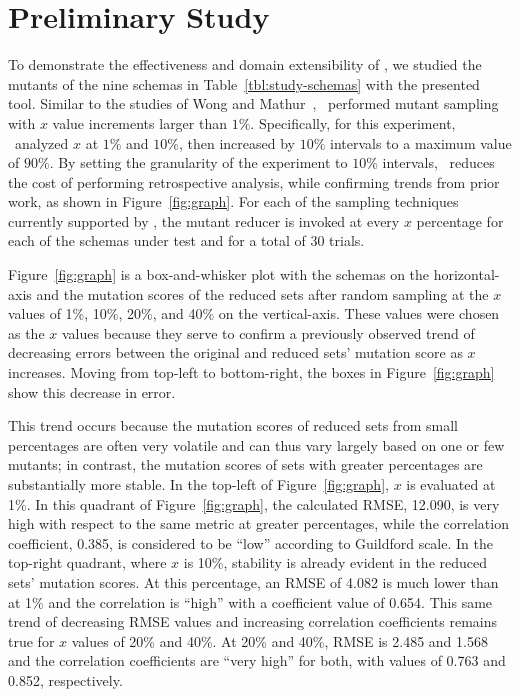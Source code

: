 \vspace*{-.25em}

\section{Preliminary Study}


To demonstrate the effectiveness and domain extensibility of \mrstudyr, we studied the mutants of the nine schemas in
Table~\ref{tbl:study-schemas} with the presented tool. Similar to the studies of Wong and
Mathur~\cite{mathur1994empirical}, \mr~performed mutant sampling with $x$ value increments larger than $1\%$.
Specifically, for this experiment, \mr~analyzed $x$ at $1\%$ and $10\%$, then increased by $10\%$ intervals to a maximum
value of $90\%$. By setting the granularity of the experiment to $10\%$ intervals, \mr~reduces the cost of performing
retrospective analysis, while confirming trends from prior work, as shown in Figure~\ref{fig:graph}. For each of the
sampling techniques currently supported by \mr, the mutant reducer is invoked at every $x$ percentage for each of the
schemas under test and for a total of 30 trials.


Figure~\ref{fig:graph} is a box-and-whisker plot with the schemas on the horizontal-axis and the mutation scores of the reduced
sets after random sampling at the $x$ values of 1\%, 10\%, 20\%, and 40\% on the vertical-axis.  These values were chosen as the
$x$ values because they serve to confirm a previously observed trend of decreasing errors between the original and reduced sets'
mutation score as $x$ increases. Moving from top-left to bottom-right, the boxes in Figure~\ref{fig:graph} show this decrease in
error.



This trend occurs because the mutation scores of reduced sets from small percentages are often very volatile and can
thus vary largely based on one or few mutants; in contrast, the mutation scores of sets with greater percentages are
substantially more stable. In the top-left of Figure~\ref{fig:graph}, $x$ is evaluated at 1\%. In this quadrant of
Figure~\ref{fig:graph}, the calculated RMSE, 12.090, is very high with respect to the same metric at greater
percentages, while the correlation coefficient, 0.385, is considered to be ``low'' according to Guildford scale. In
the top-right quadrant, where $x$ is 10\%, stability is already evident in the reduced sets' mutation scores. At this
percentage, an RMSE of 4.082 is much lower than at 1\% and the correlation is ``high'' with a coefficient value of 0.654.
This same trend of decreasing RMSE values and increasing correlation coefficients remains true for $x$ values of 20\%
and 40\%. At 20\% and 40\%, RMSE is 2.485 and 1.568 and the correlation coefficients are ``very high'' for both,
with values of 0.763 and 0.852, respectively.

